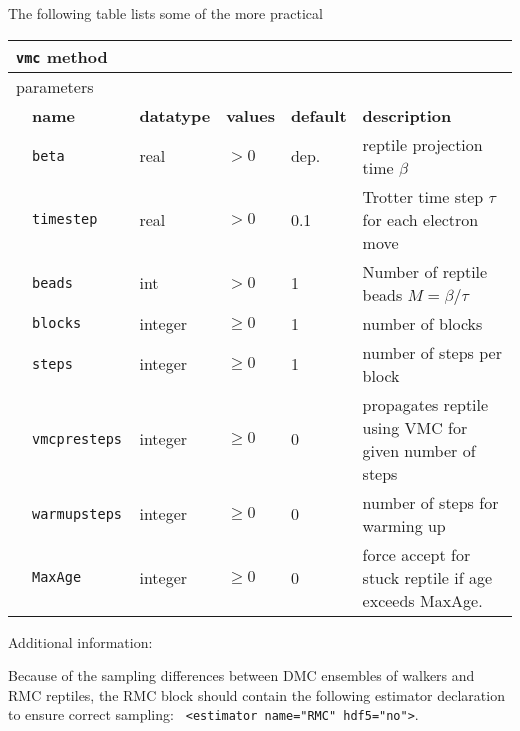 The following table lists some of the more practical 
\begin{table}[h]
\begin{center}
\begin{tabularx}{\textwidth}{l l l l l X }
\hline
\multicolumn{6}{l}{\texttt{vmc} method} \\
\hline
\multicolumn{2}{l}{parameters}  & \multicolumn{4}{l}{}\\
   &   \bfseries name     & \bfseries datatype & \bfseries values & \bfseries default   & \bfseries description \\
   &   \texttt{beta            } &  real  & $> 0$ & dep.   & reptile projection time $\beta$  \\
   &   \texttt{timestep            } &  real     & $> 0$ & 0.1 & Trotter time step $\tau$ for each electron move \\
   &   \texttt{beads           } &  int     & $> 0$ & 1 & Number of reptile beads $M=\beta/\tau$ \\
   &   \texttt{blocks              } &  integer  & $\ge 0$ & 1   & number of blocks            \\
   &   \texttt{steps               } &  integer  & $\ge 0$ & 1   & number of steps per block   \\
   &   \texttt{vmcpresteps        } &  integer  & $\ge 0$ & 0   & propagates reptile using VMC for given number of steps\\
   &   \texttt{warmupsteps         } &  integer  & $\ge 0$ & 0   & number of steps for warming up\\
   &   \texttt{MaxAge              }   & integer & $\ge 0 $   & 0   & force accept for stuck reptile if age exceeds MaxAge. \\
  \hline
\end{tabularx}
\end{center}
\end{table}

Additional information:

Because of the sampling differences between DMC ensembles of walkers and RMC reptiles, the RMC block should contain the following estimator declaration to ensure correct sampling:  \texttt{ <estimator name="RMC" hdf5="no">}. 
  
